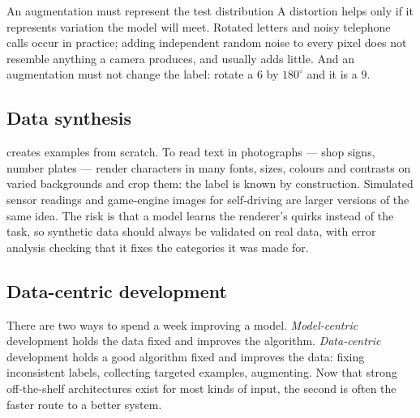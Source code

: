 \begin{pitfall}{An augmentation must represent the test distribution}
A distortion helps only if it represents variation the model will meet. Rotated
letters and noisy telephone calls occur in practice; adding independent random
noise to every pixel does not resemble anything a camera produces, and usually
adds little. And an augmentation must not change the label: rotate a $6$ by
$180^\circ$ and it is a $9$.
\end{pitfall}

\subsection{Data synthesis}

 creates examples from scratch. To read text in photographs
--- shop signs, number plates --- render characters in many fonts, sizes, colours
and contrasts on varied backgrounds and crop them: the label is known by
construction. Simulated sensor readings and game-engine images for self-driving
are larger versions of the same idea. The risk is that a model learns the
renderer's quirks instead of the task, so synthetic data should always be
validated on real data, with error analysis checking that it fixes the categories
it was made for.

\subsection{Data-centric development}

There are two ways to spend a week improving a model. \emph{Model-centric}
development holds the data fixed and improves the algorithm. \emph{Data-centric}
development holds a good algorithm fixed and improves the data: fixing
inconsistent labels, collecting targeted examples, augmenting. Now that strong
off-the-shelf architectures exist for most kinds of input, the second is often
the faster route to a better system.

